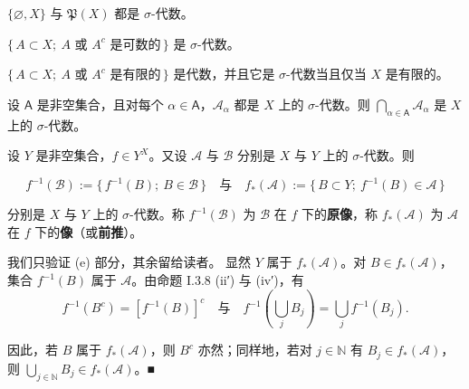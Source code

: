 \begin{example}

\begin{items}
\item

$ \{\varnothing, X\} $ 与 $ \mathfrak{P}(X) $ 都是 $ \sigma $-代数。

\item

$ \{\, A \subset X ;\ A \text{ 或 } A^{c} \text{ 是可数的} \,\} $ 是 $ \sigma $-代数。

\item

$ \{\, A \subset X ;\ A \text{ 或 } A^{c} \text{ 是有限的} \,\} $ 是代数，并且它是 $ \sigma $-代数当且仅当 $ X $ 是有限的。

\item

设 $ \mathsf{A} $ 是非空集合，且对每个 $ \alpha \in \mathsf{A} $，$ \mathcal{A}_{\alpha} $ 都是 $ X $ 上的 $ \sigma $-代数。则 $ \bigcap_{\alpha \in \mathsf{A}} \mathcal{A}_{\alpha} $ 是 $ X $ 上的 $ \sigma $-代数。

\item

设 $ Y $ 是非空集合，$ f \in Y^{X} $。又设 $ \mathcal{A} $ 与 $ \mathcal{B} $ 分别是 $ X $ 与 $ Y $ 上的 $ \sigma $-代数。则

\[
f^{-1}(\mathcal{B}) := \{\, f^{-1}(B) ;\ B \in \mathcal{B} \,\} \quad \text{与} \quad f_{*}(\mathcal{A}) := \{\, B \subset Y ;\ f^{-1}(B) \in \mathcal{A} \,\}
\]

分别是 $ X $ 与 $ Y $ 上的 $ \sigma $-代数。称 $ f^{-1}(\mathcal{B}) $ 为 $ \mathcal{B} $ 在 $ f $ 下的\textbf{原像}，称 $ f_{*}(\mathcal{A}) $ 为 $ \mathcal{A} $ 在 $ f $ 下的\textbf{像}（或\textbf{前推}）。

\proofhead
我们只验证 (e) 部分，其余留给读者。
显然 $ Y $ 属于 $ f_{*}(\mathcal{A}) $。对 $ B \in f_{*}(\mathcal{A}) $，集合 $ f^{-1}(B) $ 属于 $ \mathcal{A} $。由命题 I.3.8 (ii′) 与 (iv′)，有
\[
f^{-1}(B^{c}) = [f^{-1}(B)]^{c} \quad \text{与} \quad f^{-1}\left(\bigcup_{j} B_{j}\right) = \bigcup_{j} f^{-1}(B_{j}) .
\]

因此，若 $ B $ 属于 $ f_{*}(\mathcal{A}) $，则 $ B^{c} $ 亦然；同样地，若对 $ j \in \mathbb{N} $ 有 $ B_{j} \in f_{*}(\mathcal{A}) $，则 $ \bigcup_{j \in \mathbb{N}} B_{j} \in f_{*}(\mathcal{A}) $。\nobreak\hspace{0.35em}■

\end{items}

\end{example}

